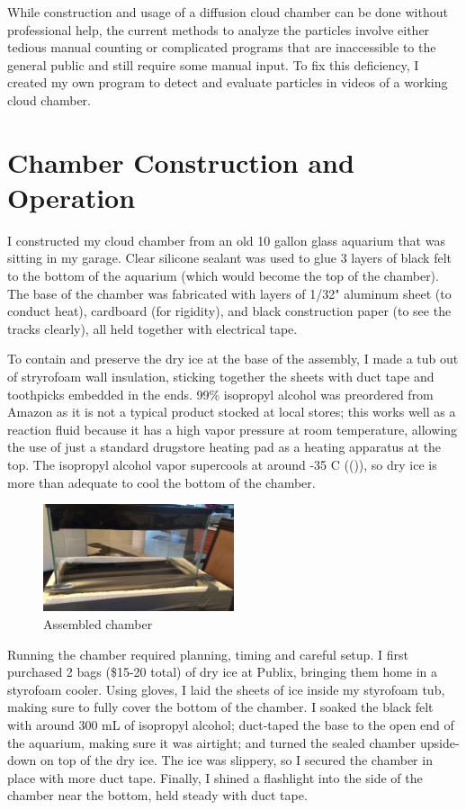 \documentclass[notitlepage,12pt]{article}
\newcommand{\mycite}[1]{((\bibentry{#1}))}
\begin{document}
While construction and usage of a diffusion cloud chamber can be done without professional help, the current methods to analyze the particles involve either tedious manual counting or complicated programs that are inaccessible to the general public and still require some manual input.  To fix this deficiency, I created my own program to detect and evaluate particles in videos of a working cloud chamber.  

\section{Chamber Construction and Operation}

I constructed my cloud chamber from an old 10 gallon glass aquarium that was sitting in my garage. Clear silicone sealant was used to glue 3 layers of black felt to the bottom of the aquarium (which would become the top of the chamber). The base of the chamber was fabricated with layers of 1/32" aluminum sheet (to conduct heat), cardboard (for rigidity), and black construction paper (to see the tracks clearly), all held together with electrical tape.

To contain and preserve the dry ice at the base of the assembly, I made a tub out of stryrofoam wall insulation, sticking together the sheets with duct tape and toothpicks embedded in the ends.  99\% isopropyl alcohol was preordered from Amazon as it is not a typical product stocked at local stores; this works well as a reaction fluid because it has a high vapor pressure at room temperature, allowing the use of just a standard drugstore heating pad as a heating apparatus at the top. The isopropyl alcohol vapor supercools at around -35 \degree{}C \mycite{isopropanol}, so dry ice is more than adequate to cool the bottom of the chamber.

\begin{figure}
\centering
\includegraphics[width=0.5\textwidth]{assembled}
\caption{Assembled chamber\label{fig:assembled}}
\end{figure}

Running the chamber required planning, timing and careful setup. I first purchased 2 bags (\$15-20 total) of dry ice at Publix, bringing them home in a styrofoam cooler. Using gloves, I laid the sheets of ice inside my styrofoam tub, making sure to fully cover the bottom of the chamber. I soaked the black felt with around 300 mL of isopropyl alcohol; duct-taped the base to the open end of the aquarium, making sure it was airtight; and turned the sealed chamber upside-down on top of the dry ice. The ice was slippery, so I secured the chamber in place with more duct tape. Finally, I shined a flashlight into the side of the chamber near the bottom, held steady with duct tape.
\end{document}
